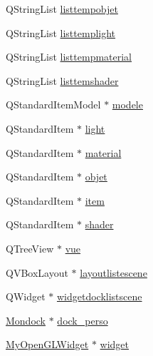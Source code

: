 \begin{DoxyCompactItemize}
Q\+String\+List \hyperlink{class_main_window_aefc66839b56eea01fa7b8b49ab5182a7}{listtempobjet}
\item 
Q\+String\+List \hyperlink{class_main_window_a2da91caa3f9e740cb7a50e110516212e}{listtemplight}
\item 
Q\+String\+List \hyperlink{class_main_window_a6eb445b9be6c49cf139c74b356ef7e58}{listtempmaterial}
\item 
Q\+String\+List \hyperlink{class_main_window_a889162c5299f284129bec68a0cc45cbf}{listtemshader}
\item 
Q\+Standard\+Item\+Model $\ast$ \hyperlink{class_main_window_abb752b382e336483740c8e0ad21cbcf5}{modele}
\item 
Q\+Standard\+Item $\ast$ \hyperlink{class_main_window_a36a5d988881c1ce38d0692ed500067e1}{light}
\item 
Q\+Standard\+Item $\ast$ \hyperlink{class_main_window_ad89e3c0f75025021cddb58c4cdd5edd8}{material}
\item 
Q\+Standard\+Item $\ast$ \hyperlink{class_main_window_ac76a7b94394a43600a0719ce4af388fc}{objet}
\item 
Q\+Standard\+Item $\ast$ \hyperlink{class_main_window_a4deb65af7d5cb84853c31faa114f0304}{item}
\item 
Q\+Standard\+Item $\ast$ \hyperlink{class_main_window_a8e49ee04eabb719ac4be13ba8cd3fe38}{shader}
\item 
Q\+Tree\+View $\ast$ \hyperlink{class_main_window_ac0150259862bd3b40a76b35a00b9e97a}{vue}
\item 
Q\+V\+Box\+Layout $\ast$ \hyperlink{class_main_window_ab25fb184d802450a71a998cf113d481a}{layoutlistescene}
\item 
Q\+Widget $\ast$ \hyperlink{class_main_window_a38d553a96a3898e65b500c639673b8de}{widgetdocklistscene}
\item 
\hyperlink{class_mondock}{Mondock} $\ast$ \hyperlink{class_main_window_a0733647a631eeb38fc72d3cf7e01c3db}{dock\+\_\+perso}
\item 
\hyperlink{class_my_open_g_l_widget}{My\+Open\+G\+L\+Widget} $\ast$ \hyperlink{class_main_window_a0a21ff789dee5a19a74d2461cf0820dc}{widget}
\end{DoxyCompactItemize}



